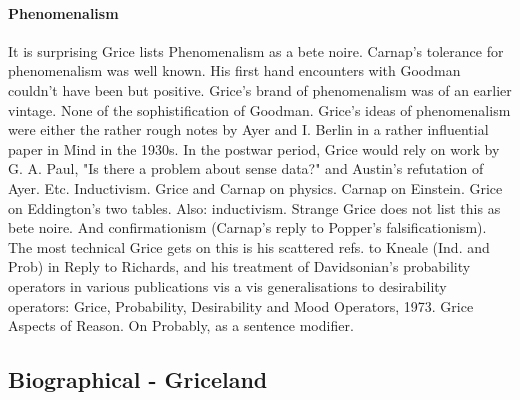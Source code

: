 \documentclass[10pt,titlepage]{book}
\begin{document}
{\paragraph{Phenomenalism}

It is surprising Grice lists Phenomenalism as a bete 
noire. Carnap's tolerance  for phenomenalism was well known. His first hand 
encounters with Goodman  couldn't have been but positive. Grice's brand of 
phenomenalism was of an  earlier vintage. None of the sophistification of 
Goodman. Grice's ideas of  phenomenalism were either the rather rough notes by Ayer 
and I. Berlin in a  rather influential paper in Mind in the 1930s. In the 
postwar period, Grice  would rely on work by G. A. Paul, "Is there a problem 
about sense data?" and  Austin's refutation of Ayer. Etc. 
Inductivism.  Grice and Carnap on physics. Carnap on Einstein. Grice on 
Eddington's two  tables. Also: 
inductivism.  Strange Grice does not list this as bete noire. And 
confirmationism (Carnap's  reply to Popper's falsificationism). The most technical 
Grice gets on this is  his scattered refs. to Kneale (Ind. and Prob) in Reply 
to Richards, and his  treatment of Davidsonian's probability operators in 
various publications vis a  vis generalisations to desirability operators:  
Grice, Probability, Desirability and Mood  Operators, 1973. Grice Aspects of 
Reason. On Probably, as a sentence modifier.   

\subsection{Biographical - Griceland}

}
\end{document}
